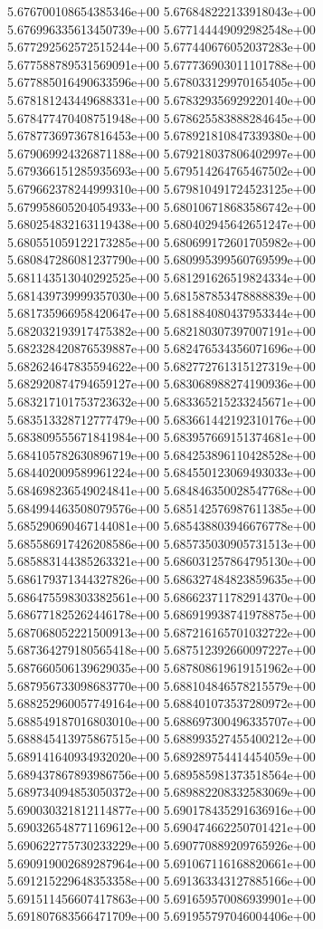 5.676700108654385346e+00
5.676848222133918043e+00
5.676996335613450739e+00
5.677144449092982548e+00
5.677292562572515244e+00
5.677440676052037283e+00
5.677588789531569091e+00
5.677736903011101788e+00
5.677885016490633596e+00
5.678033129970165405e+00
5.678181243449688331e+00
5.678329356929220140e+00
5.678477470408751948e+00
5.678625583888284645e+00
5.678773697367816453e+00
5.678921810847339380e+00
5.679069924326871188e+00
5.679218037806402997e+00
5.679366151285935693e+00
5.679514264765467502e+00
5.679662378244999310e+00
5.679810491724523125e+00
5.679958605204054933e+00
5.680106718683586742e+00
5.680254832163119438e+00
5.680402945642651247e+00
5.680551059122173285e+00
5.680699172601705982e+00
5.680847286081237790e+00
5.680995399560769599e+00
5.681143513040292525e+00
5.681291626519824334e+00
5.681439739999357030e+00
5.681587853478888839e+00
5.681735966958420647e+00
5.681884080437953344e+00
5.682032193917475382e+00
5.682180307397007191e+00
5.682328420876539887e+00
5.682476534356071696e+00
5.682624647835594622e+00
5.682772761315127319e+00
5.682920874794659127e+00
5.683068988274190936e+00
5.683217101753723632e+00
5.683365215233245671e+00
5.683513328712777479e+00
5.683661442192310176e+00
5.683809555671841984e+00
5.683957669151374681e+00
5.684105782630896719e+00
5.684253896110428528e+00
5.684402009589961224e+00
5.684550123069493033e+00
5.684698236549024841e+00
5.684846350028547768e+00
5.684994463508079576e+00
5.685142576987611385e+00
5.685290690467144081e+00
5.685438803946676778e+00
5.685586917426208586e+00
5.685735030905731513e+00
5.685883144385263321e+00
5.686031257864795130e+00
5.686179371344327826e+00
5.686327484823859635e+00
5.686475598303382561e+00
5.686623711782914370e+00
5.686771825262446178e+00
5.686919938741978875e+00
5.687068052221500913e+00
5.687216165701032722e+00
5.687364279180565418e+00
5.687512392660097227e+00
5.687660506139629035e+00
5.687808619619151962e+00
5.687956733098683770e+00
5.688104846578215579e+00
5.688252960057749164e+00
5.688401073537280972e+00
5.688549187016803010e+00
5.688697300496335707e+00
5.688845413975867515e+00
5.688993527455400212e+00
5.689141640934932020e+00
5.689289754414454059e+00
5.689437867893986756e+00
5.689585981373518564e+00
5.689734094853050372e+00
5.689882208332583069e+00
5.690030321812114877e+00
5.690178435291636916e+00
5.690326548771169612e+00
5.690474662250701421e+00
5.690622775730233229e+00
5.690770889209765926e+00
5.690919002689287964e+00
5.691067116168820661e+00
5.691215229648353358e+00
5.691363343127885166e+00
5.691511456607417863e+00
5.691659570086939901e+00
5.691807683566471709e+00
5.691955797046004406e+00
